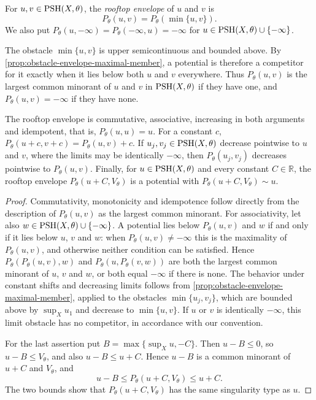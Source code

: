 \begin{definition}\label{def:rooftop-envelope}
For $u,v\in\mathrm{PSH}(X,\theta)$, the \emph{rooftop envelope} of $u$ and $v$ is
\[
 P_\theta(u,v)=P_\theta(\min\{u,v\}).
\]
We also put $P_\theta(u,-\infty)=P_\theta(-\infty,u)=-\infty$ for $u\in\mathrm{PSH}(X,\theta)\cup\{-\infty\}$.
\end{definition}
The obstacle $\min\{u,v\}$ is upper semicontinuous and bounded above. By \cref{prop:obstacle-envelope-maximal-member}, a potential is therefore a competitor for it exactly when it lies below both $u$ and $v$ everywhere. Thus $P_\theta(u,v)$ is the largest common minorant of $u$ and $v$ in $\mathrm{PSH}(X,\theta)$ if they have one, and $P_\theta(u,v)=-\infty$ if they have none.

\begin{proposition}\label{prop:rooftop-algebra}
The rooftop envelope is commutative, associative, increasing in both arguments and idempotent, that is, $P_\theta(u,u)=u$. For a constant $c$, $P_\theta(u+c,v+c)=P_\theta(u,v)+c$. If $u_j,v_j\in\mathrm{PSH}(X,\theta)$ decrease pointwise to $u$ and $v$, where the limits may be identically $-\infty$, then $P_\theta(u_j,v_j)$ decreases pointwise to $P_\theta(u,v)$. Finally, for $u\in\mathrm{PSH}(X,\theta)$ and every constant $C\in\mathbb R$, the rooftop envelope $P_\theta(u+C,V_\theta)$ is a potential with $P_\theta(u+C,V_\theta)\sim u$.
\end{proposition}
\begin{proof}
Commutativity, monotonicity and idempotence follow directly from the description of $P_\theta(u,v)$ as the largest common minorant. For associativity, let also $w\in\mathrm{PSH}(X,\theta)\cup\{-\infty\}$. A potential lies below $P_\theta(u,v)$ and $w$ if and only if it lies below $u$, $v$ and $w$: when $P_\theta(u,v)\ne-\infty$ this is the maximality of $P_\theta(u,v)$, and otherwise neither condition can be satisfied. Hence $P_\theta(P_\theta(u,v),w)$ and $P_\theta(u,P_\theta(v,w))$ are both the largest common minorant of $u$, $v$ and $w$, or both equal $-\infty$ if there is none. The behavior under constant shifts and decreasing limits follows from \cref{prop:obstacle-envelope-maximal-member}, applied to the obstacles $\min\{u_j,v_j\}$, which are bounded above by $\sup_Xu_1$ and decrease to $\min\{u,v\}$. If $u$ or $v$ is identically $-\infty$, this limit obstacle has no competitor, in accordance with our convention.

For the last assertion put $B=\max\{\sup_Xu,-C\}$. Then $u-B\leq0$, so $u-B\leq V_\theta$, and also $u-B\leq u+C$. Hence $u-B$ is a common minorant of $u+C$ and $V_\theta$, and
\[
 u-B\leq P_\theta(u+C,V_\theta)\leq u+C.
\]
The two bounds show that $P_\theta(u+C,V_\theta)$ has the same singularity type as $u$.
\end{proof}

